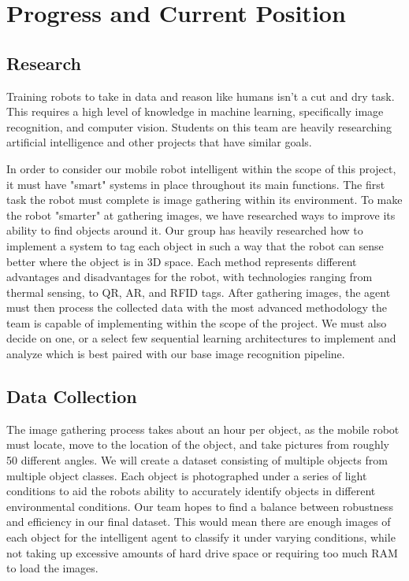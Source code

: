\documentclass[draftclsnofoot, onecolumn, 10pt, compsoc]{IEEEtran}
\begin{document}
\newpage
\section{Progress and Current Position}

\subsection{Research}
Training robots to take in data and reason like humans isn't a cut and dry task. This requires a high level of knowledge in machine learning, specifically image recognition, and computer vision. Students on this team are heavily researching artificial intelligence and other projects that have similar goals. 

In order to consider our mobile robot intelligent within the scope of this project, it must have "smart" systems in place throughout its main functions. The first task the robot must complete is image gathering within its environment. To make the robot "smarter" at gathering images, we have researched ways to improve its ability to find objects around it. Our group has heavily researched how to implement a system to tag each object in such a way that the robot can sense better where the object is in 3D space. Each method represents different advantages and disadvantages for the robot, with technologies ranging from thermal sensing, to QR, AR, and RFID tags. After gathering images, the agent must then process the collected data with the most advanced methodology the team is capable of implementing within the scope of the project. We must also decide on one, or a select few sequential learning architectures to implement and analyze which is best paired with our base image recognition pipeline. 

\subsection{Data Collection}
The image gathering process takes about an hour per object, as the mobile robot must locate, move to the location of the object, and take pictures from roughly 50 different angles. We will create a dataset consisting of multiple objects from multiple object classes. Each object is photographed under a series of light conditions to aid the robots ability to accurately identify objects in different environmental conditions. Our team hopes to find a balance between robustness and efficiency in our final dataset. This would mean there are enough images of each object for the intelligent agent to classify it under varying conditions, while not taking up excessive amounts of hard drive space or requiring too much RAM to load the images. 
\end{document}
